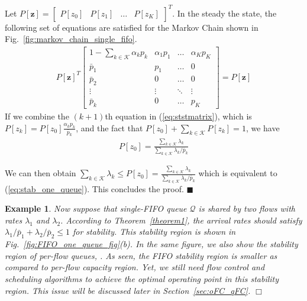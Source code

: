 \documentclass[conference]{IEEEtran}
\newtheorem{example}{Example}
\newcommand{\Kset}{\mathcal{K}}
\newcommand{\Qset}{\mathcal{Q}}
\begin{document}
Let $P[\boldsymbol z] = \begin{bmatrix} P[z_0] & P[z_1] & \ldots & P[z_K] \end{bmatrix}^{T}$. In the steady the state, the following set of equations are satisfied for the Markov Chain shown in Fig.~\ref{fig:markov_chain_single_fifo}.  
\begin{align} \label{eq:ststmatrix}
P[\boldsymbol z]^{T}   
\begin{bmatrix}
1 - \sum_{k \in \Kset} \alpha_kp_k & \alpha_1p_1  & \ldots & \alpha_Kp_K \\
\bar{p}_1 						  & p_1          & \ldots & 0 			\\
\bar{p}_2 						  & 0            & \ldots & 0 			\\
   \vdots 						  & \vdots       & \ddots & \vdots 	\\
\bar{p}_{k} 						  & 0            & \ldots & p_K           
\end{bmatrix} 
= P[\boldsymbol z]
\end{align} 
If we combine the $(k+1)$th equation in (\ref{eq:ststmatrix}), which is $P[z_k] = P[z_0] \frac{\alpha_kp_k}{\bar{p}_{k}}$, and the fact that $P[z_0] + \sum_{k \in \Kset} P[z_k] = 1$, we have
\begin{align}
P[z_0] = \frac{\sum_{k \in \Kset} \lambda_{k}}{\sum_{k \in \Kset} \lambda_{k}/\bar{p}_{k}}
\end{align}

We can then obtain $\sum_{k \in \Kset} \lambda_{k} \leq P[z_0] = \frac{\sum_{k \in \Kset} \lambda_{k} }{\sum_{k \in \Kset} \lambda_{k}/\bar{p}_{k}}$ which is equivalent to (\ref{eq:stab_one_queue}). This concludes the proof.
\hfill $\blacksquare$

\begin{example}
Now suppose that single-FIFO queue $\Qset$ is shared by two flows with rates $\lambda_{1}$ and $\lambda_{2}$. According to Theorem~\ref{theorem1}, the arrival rates should satisfy ${\lambda_{1}}/{\bar{p}_{1}} + {\lambda_{2}}/{\bar{p}_{2}} \leq 1$ for stability. This stability region is shown in Fig.~\ref{fig:FIFO_one_queue_fig}(b). In the same figure, we also show the stability region of per-flow queues, \cite{neely_book}. As seen, the FIFO stability region is smaller as compared to per-flow capacity region. Yet, we still need flow control and scheduling algorithms to achieve the optimal operating point in this stability region. This issue will be discussed later in Section~\ref{sec:oFC_qFC}.
\hfill $\Box$
\end{example}
\end{document}
